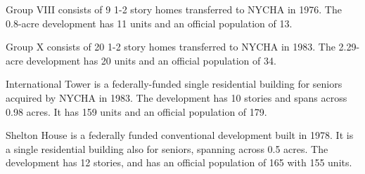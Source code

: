 Group VIII consists of 9 1-2 {\textonehalf} story homes transferred to NYCHA in 1976. The 0.8-acre development has 11 units and an official population of 13. 

Group X consists of 20 1-2 {\textonehalf} story homes transferred to NYCHA in 1983. The 2.29-acre development has 20 units and an official population of 34.

International Tower is a federally-funded single residential building for seniors acquired by NYCHA in 1983. The development has 10 stories and spans across 0.98 acres. It has 159 units and an official population of 179.

Shelton House is a federally funded conventional development built in 1978. It is a single residential building also for seniors, spanning across 0.5 acres. The development has 12 stories, and has an official population of 165 with 155 units.